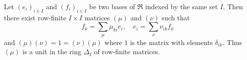Let $(e_i)_{i \in I}$ and $(f_i)_{i \in I}$ be two bases of $\mathfrak{R}$ indexed by the same set $I$. Then there exist row-finite $I \times I$ matrices $(\mu)$ and $(\nu)$ such that
$$f_k = \sum_{\mu} \mu_{ki} e_i, \quad e_i = \sum_{\nu} \nu_{ik} f_k$$
and $(\mu)(\nu) = 1 = (\nu)(\mu)$ where $1$ is the matrix with elements $\delta_{ik}$. Thus $(\mu)$ is a unit in the ring $\Delta_I$ of row-finite matrices.
